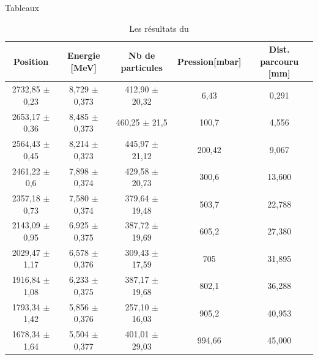 \documentclass[a4paper,11pt,liststotocnumbered,bibtotocnumbered]{scrartcl}
\begin{document}
\begin{appendix}
\begin{section}{Tableaux}
   \begin{table}[H]
    \begin{center}
     \begin{tabular}{c|c|c|c|c}
      Position	&Energie [MeV]	&Nb de particules	&Pression[mbar]		&Dist. parcouru [mm]\\ \hline
      2732,85 $\pm$ 0,23	&8,729 $\pm$ 0,373	&412,90 $\pm$ 20,32	&6,43	&0,291\\
      2653,17 $\pm$ 0,36	&8,485 $\pm$ 0,373	&460,25 $\pm$ 21,5	&100,7	&4,556\\
      2564,43 $\pm$ 0,45	&8,214 $\pm$ 0,373	&445,97 $\pm$ 21,12	&200,42	&9,067\\
      2461,22 $\pm$ 0,6		&7,898 $\pm$ 0,374	&429,58 $\pm$ 20,73	&300,6	&13,600\\
      2357,18 $\pm$ 0,73	&7,580 $\pm$ 0,374	&379,64 $\pm$ 19,48	&503,7	&22,788\\
      2143,09 $\pm$ 0,95	&6,925 $\pm$ 0,375	&387,72 $\pm$ 19,69	&605,2	&27,380\\
      2029,47 $\pm$ 1,17	&6,578 $\pm$ 0,376	&309,43 $\pm$ 17,59	&705	&31,895\\
      1916,84 $\pm$ 1,08	&6,233 $\pm$ 0,375	&387,17 $\pm$ 19,68	&802,1	&36,288\\
      1793,34 $\pm$ 1,42	&5,856 $\pm$ 0,376	&257,10 $\pm$ 16,03	&905,2	&40,953\\
      1678,34 $\pm$ 1,64	&5,504 $\pm$ 0,377	&401,01 $\pm$ 29,03	&994,66	&45,000\\
     \end{tabular}
    \caption{\label{tabelle-po}Les résultats du }
    \end{center}
   \end{table}
  \end{section}
 \end{appendix}

 
\end{document}
